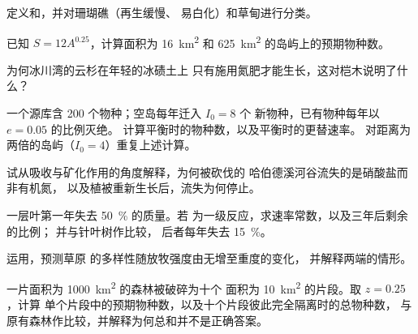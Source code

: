 \begin{exercise}[$\star$]\label{exo:b1:ecosystem-dynamics:3}
定义和，并对珊瑚礁（再生缓慢、
易白化）和草甸进行分类。
\end{exercise}

\begin{exercise}[$\star$]\label{exo:b1:ecosystem-dynamics:4}
已知 $S = 12 A^{0.25}$，计算面积为
\qty{16}{km^2} 和 \qty{625}{km^2} 的岛屿上的预期物种数。
\end{exercise}

\begin{exercise}[$\star\star$]\label{exo:b1:ecosystem-dynamics:5}
为何冰川湾的云杉在年轻的冰碛土上
只有施用氮肥才能生长，这对桤木说明了什么？
\end{exercise}

\begin{exercise}[$\star\star$]\label{exo:b1:ecosystem-dynamics:6}
一个源库含 200 个物种；空岛每年迁入 $I_0 = 8$ 个
新物种，已有物种每年以 $e = 0.05$ 的比例灭绝。
计算平衡时的物种数，以及平衡时的更替速率。
对距离为两倍的岛屿（$I_0 = 4$）重复上述计算。
\end{exercise}

\begin{exercise}[$\star\star$]\label{exo:b1:ecosystem-dynamics:7}
试从吸收与矿化作用的角度解释，为何被砍伐的
哈伯德溪河谷流失的是硝酸盐而非有机氮，
以及植被重新生长后，流失为何停止。
\end{exercise}

\begin{exercise}[$\star\star$]\label{exo:b1:ecosystem-dynamics:8}
一层叶第一年失去 \qty{50}{\%} 的质量。若
为一级反应，求速率常数，以及三年后剩余的比例；
并与针叶树作比较，
后者每年失去 \qty{15}{\%}。
\end{exercise}

\begin{exercise}[$\star\star$]\label{exo:b1:ecosystem-dynamics:9}
运用，预测草原
的多样性随放牧强度由无增至重度的变化，
并解释两端的情形。
\end{exercise}

\begin{exercise}[$\star\star\star$]\label{exo:b1:ecosystem-dynamics:10}
一片面积为 \qty{1000}{km^2} 的森林被破碎为十个
面积为 \qty{10}{km^2} 的片段。取 $z = 0.25$，计算
单个片段中的预期物种数，以及十个片段彼此完全隔离时的总物种数，
与原有森林作比较，并解释为何总和并不是正确答案。
\end{exercise}

